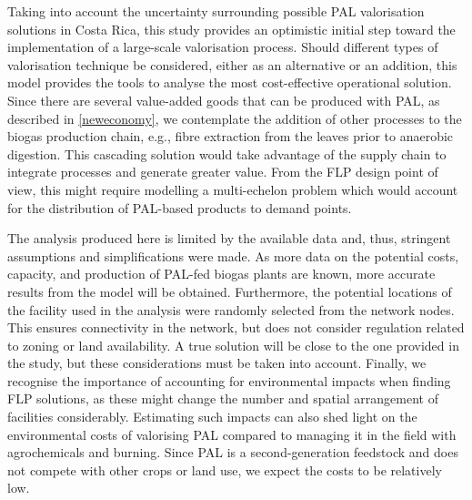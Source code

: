 Taking into account the uncertainty surrounding possible PAL valorisation solutions in Costa Rica, this study provides an optimistic initial step toward the implementation of a large-scale valorisation process. Should different types of valorisation technique be considered, either as an alternative or an addition, this model provides the tools to analyse the most cost-effective operational solution. Since there are several value-added goods that can be produced with PAL, as described in \cref{neweconomy}, we contemplate the addition of other processes to the biogas production chain, e.g., fibre extraction from the leaves prior to anaerobic digestion. This cascading solution would take advantage of the supply chain to integrate processes and generate greater value. From the FLP design point of view, this might require modelling a multi-echelon problem which would account for the distribution of PAL-based products to demand points. 

The analysis produced here is limited by the available data and, thus, stringent assumptions and simplifications were made. As more data on the potential costs, capacity, and production of PAL-fed biogas plants are known, more accurate results from the model will be obtained. Furthermore, the potential locations of the facility used in the analysis were randomly selected from the network nodes. This ensures connectivity in the network, but does not consider regulation related to zoning or land availability. A true solution will be close to the one provided in the study, but these considerations must be taken into account. Finally, we recognise the importance of accounting for environmental impacts when finding FLP solutions, as these might change the number and spatial arrangement of facilities considerably. Estimating such impacts can also shed light on the environmental costs of valorising PAL compared to managing it in the field with agrochemicals and burning. Since PAL is a second-generation feedstock and does not compete with other crops or land use, we expect the costs to be relatively low.

